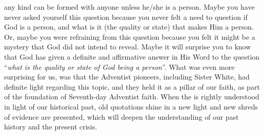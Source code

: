 any kind can be formed with anyone unless he/she is a person. Maybe you have never asked yourself this question because you never felt a need to question if God is a person, and what is it (the quality or state) that makes Him a person. Or, maybe you were refraining from this question because you felt it might be a mystery that God did not intend to reveal. Maybe it will surprise you to know that God has given a definite and affirmative answer in His Word to the question “\textit{what is the quality or state of God being a person}”. What was even more surprising for us, was that the Adventist pioneers, including Sister White, had definite light regarding this topic, and they held it as a pillar of our faith, as part of the foundation of Seventh-day Adventist faith. When the  is rightly understood in light of our historical past, old quotations shine in a new light and new shreds of evidence are presented, which will deepen the understanding of our past history and the present crisis.


